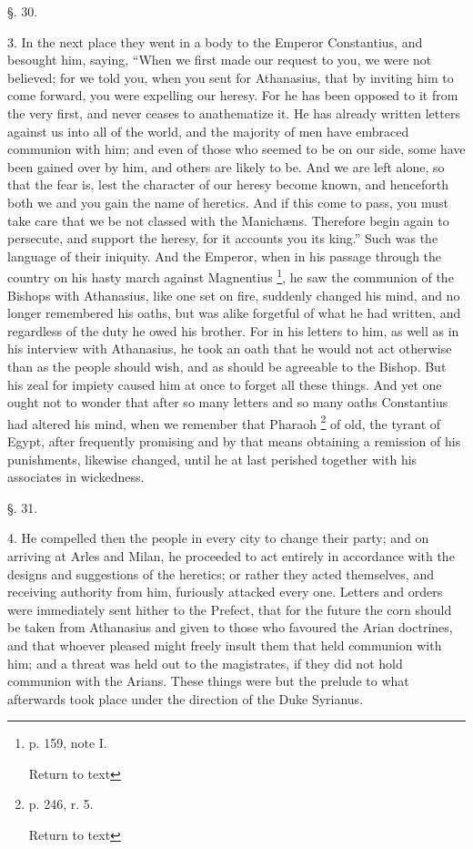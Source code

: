 §. 30.

3. In the next place they went in a body to the
Emperor Constantius, and besought him, saying, ``When we first made our
request to you, we were not believed; for we told you, when you sent
for Athanasius, that by inviting him to come forward, you were
expelling our heresy. For he has been opposed to it from the very
first, and never ceases to anathematize it. He has already written
letters against us into all of the world, and the majority of
men have embraced communion with him; and even of those who seemed to
be on our side, some have been gained over by him, and others are
likely to be. And we are left alone, so that the fear is, lest the
character of our heresy become known, and henceforth both we and you
gain the name of heretics. And if this come to pass, you must take
care that we be not classed with the Manichæns. Therefore begin again
to persecute, and support the heresy, for it accounts you its king.''
Such was the language of their iniquity. And the Emperor, when in his
passage through the country on his hasty march against Magnentius \footnote{p. 159, note I.

Return to text}, he saw the communion of the Bishops with Athanasius, like one
set on fire, suddenly changed his mind, and no longer remembered his
oaths, but was alike forgetful of what he had written, and regardless
of the duty he owed his brother. For in his letters to him, as well as
in his interview with Athanasius, he took an oath that he would not
act otherwise than as the people should wish, and as should be
agreeable to the Bishop. But his zeal for impiety caused him at once
to forget all these things. And yet one ought not to wonder that after
so many letters and so many oaths Constantius had altered his mind,
when we remember that Pharaoh \footnote{p. 246, r. 5.

Return to text} of old, the tyrant of Egypt, after frequently promising and by
that means obtaining a remission of his punishments, likewise changed,
until he at last perished together with his associates in wickedness.

§. 31.

4. He compelled then the people in every city to
change their party; and on arriving at Arles and Milan, he proceeded
to act entirely in accordance with the designs and suggestions of the
heretics; or rather they acted themselves, and receiving authority
from him, furiously attacked every one. Letters and orders were
immediately sent hither to the Prefect, that for the future the corn
should be taken from Athanasius and given to those who favoured the
Arian doctrines, and that whoever pleased might freely insult them
that held communion with him; and a threat was held out to the
magistrates, if they did not hold communion with the Arians. These
things were but the prelude to what afterwards took place under the
direction of the Duke Syrianus.

